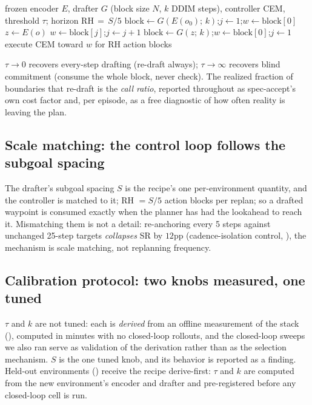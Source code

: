 \documentclass{article}
\begin{document}
\begin{algorithm}[h]
\small
\caption{Spec-accept: reality-verified speculative consumption (one env; run per env).}
\label{alg:specaccept}
\begin{algorithmic}[1]
\Require frozen encoder $E$, drafter $G$ (block size $N$, $k$ DDIM steps), controller
CEM, threshold $\tau$; horizon RH$\,{=}\,S/5$
\State $\mathrm{block}\gets G(E(o_0);\,k)$;\quad $j\gets 1$;\quad $w\gets \mathrm{block}[0]$
  \State $z\gets E(o)$
     \State $w\gets \mathrm{block}[j]$;\quad $j\gets j+1$
  \Else
     \State $\mathrm{block}\gets G(z;\,k)$;\quad $w\gets \mathrm{block}[0]$;\quad $j\gets 1$
  \EndIf
  \State execute CEM toward $w$ for RH action blocks
\EndFor
\end{algorithmic}
\end{algorithm}



\noindent $\tau{\to}0$ recovers every-step drafting (re-draft always); $\tau{\to}\infty$
recovers blind commitment (consume the whole block, never check). The realized fraction
of boundaries that re-draft is the \emph{call ratio}, reported throughout as
spec-accept's own cost factor and, per episode, as a free diagnostic of how often
reality is leaving the plan.

\subsection{Scale matching: the control loop follows the subgoal spacing}
\label{sec:method-scale}
The drafter's subgoal spacing $S$ is the recipe's one per-environment quantity, and the
controller is matched to it; RH $= S/5$ action blocks per replan; so a drafted
waypoint is consumed exactly when the planner has had the lookahead to reach it.
Mismatching them is not a detail: re-anchoring every 5 steps against unchanged
25-step targets \emph{collapses} SR by $12$pp (cadence-isolation control,
), the mechanism is scale matching, not replanning frequency.

\subsection{Calibration protocol: two knobs measured, one tuned}
\label{sec:method-config}
$\tau$ and $k$ are not tuned: each is \emph{derived} from an offline measurement of
the stack (), computed in minutes with no closed-loop rollouts, and
the closed-loop sweeps we also ran serve as validation of the derivation rather than
as the selection mechanism. $S$ is the one tuned knob, and its behavior is reported
as a finding. Held-out environments () receive the recipe
derive-first: $\tau$ and $k$ are computed from the new environment's encoder and
drafter and pre-registered before any closed-loop cell is run.
\end{document}
